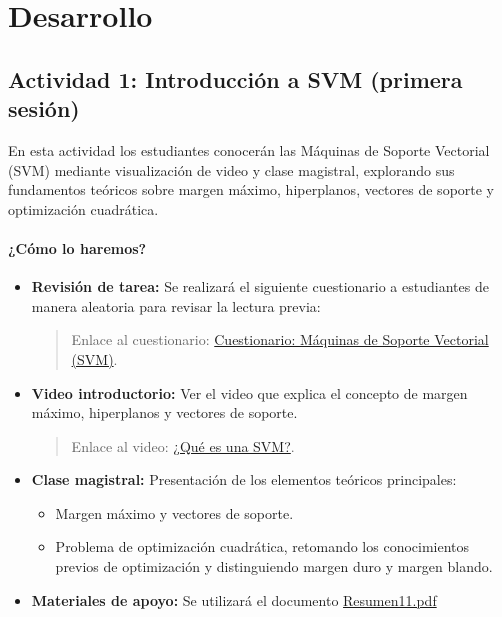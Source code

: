 \documentclass[a4,11pt]{aleph-notas}
\begin{document}
\section*{Desarrollo}

\subsection*{Actividad 1: Introducción a SVM (primera sesión)}

En esta actividad los estudiantes conocerán las Máquinas de Soporte Vectorial (SVM) mediante visualización de video y clase magistral, explorando sus fundamentos teóricos sobre margen máximo, hiperplanos, vectores de soporte y optimización cuadrática.

\paragraph{¿Cómo lo haremos?}
\begin{itemize}[leftmargin=*]
    \item \textbf{Revisión de tarea:} Se realizará el siguiente cuestionario a estudiantes de manera aleatoria para revisar la lectura previa:
    \begin{quote}
        Enlace al cuestionario: \href{https://gemini.google.com/share/a88a74d2db79}{Cuestionario: Máquinas de Soporte Vectorial (SVM)}.
    \end{quote}
    \item \textbf{Video introductorio:}
    Ver el video que explica el concepto de margen máximo, hiperplanos y vectores de soporte.
    \begin{quote}
        Enlace al video: \href{https://www.youtube.com/watch?v=jo9slrXKKNo}{¿Qué es una SVM?}.
    \end{quote}
    
    \item \textbf{Clase magistral:}
    Presentación de los elementos teóricos principales:
    \begin{itemize}
        \item Margen máximo y vectores de soporte.
        \item Problema de optimización cuadrática, retomando los conocimientos previos de optimización y distinguiendo margen duro y margen blando.
    \end{itemize}
    
    \item \textbf{Materiales de apoyo:} 
    Se utilizará el documento \href{https://andres-merino.github.io/AprendizajeAutomaticoInicial-05-N0105/2-Resumenes/Resumen11.pdf}{Resumen11.pdf}
    
\end{itemize}
\end{document}
